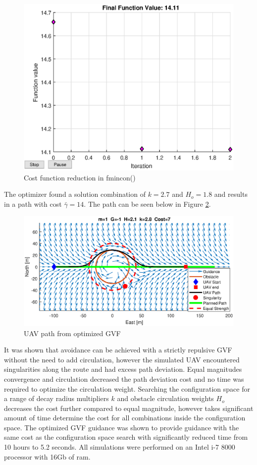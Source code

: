 \documentclass[numbered,pdftex]{ohio-etd}
\begin{document}
\begin{figure}[H]
	\centering
	\includegraphics[width=12cm]{PaperFigures/Methods/finalFunctionValue}
	\caption{Cost function reduction in fmincon()}
	\label{fig:finalfunctionvalue}
\end{figure}

The optimizer found a solution combination of $k=2.7$ and $H_o = 1.8$ and results in a path with cost $\bar{\gamma}=14$. The path can be seen below in Figure \ref{fig:optimizedPath}.

\begin{figure}[H]
	\centering
	\includegraphics[trim=0 85 0 85,clip,width=15cm]{PaperFigures/Methods/solvedN1V10}
	\caption{UAV path from optimized GVF}
	\label{fig:optimizedPath}
\end{figure}


It was shown that avoidance can be achieved with a strictly repulsive GVF without the need to add circulation, however the simulated UAV encountered singularities along the route and had excess path deviation. Equal magnitudes convergence and circulation decreased the path deviation cost and no time was required to optimize the circulation weight. Searching the configuration space for a range of decay radius multipliers $k$ and obstacle circulation weights $H_o$ decreases the cost further compared to equal magnitude, however takes significant amount of time determine the cost for all combinations inside the configuration space. The optimized GVF guidance was shown to provide guidance with the same cost as the configuration space search with significantly reduced time from 10 hours to 5.2 seconds. All simulations were performed on an Intel i-7 8000 processor with 16Gb of ram. \\
\end{document}
